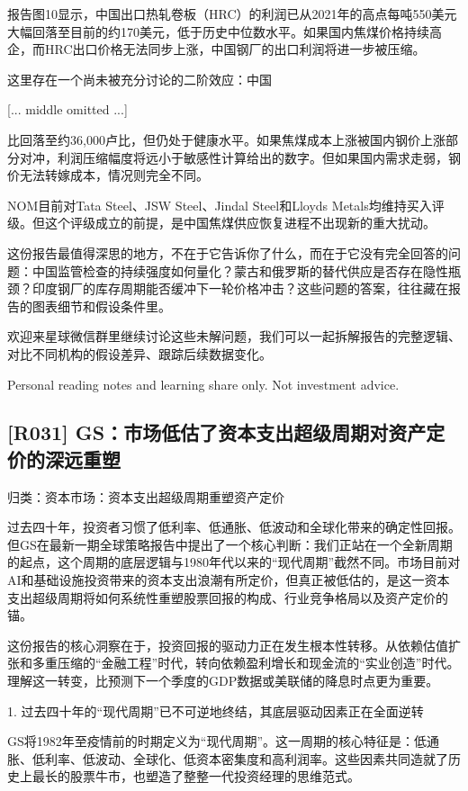 \documentclass[11pt]{ctexart}
\begin{document}
报告图10显示，中国出口热轧卷板（HRC）的利润已从2021年的高点每吨550美元大幅回落至目前的约170美元，低于历史中位数水平。如果国内焦煤价格持续高企，而HRC出口价格无法同步上涨，中国钢厂的出口利润将进一步被压缩。

这里存在一个尚未被充分讨论的二阶效应：中国

[... middle omitted ...]

比回落至约36,000卢比，但仍处于健康水平。如果焦煤成本上涨被国内钢价上涨部分对冲，利润压缩幅度将远小于敏感性计算给出的数字。但如果国内需求走弱，钢价无法转嫁成本，情况则完全不同。

NOM目前对Tata Steel、JSW Steel、Jindal Steel和Lloyds Metals均维持买入评级。但这个评级成立的前提，是中国焦煤供应恢复进程不出现新的重大扰动。

这份报告最值得深思的地方，不在于它告诉你了什么，而在于它没有完全回答的问题：中国监管检查的持续强度如何量化？蒙古和俄罗斯的替代供应是否存在隐性瓶颈？印度钢厂的库存周期能否缓冲下一轮价格冲击？这些问题的答案，往往藏在报告的图表细节和假设条件里。

欢迎来星球微信群里继续讨论这些未解问题，我们可以一起拆解报告的完整逻辑、对比不同机构的假设差异、跟踪后续数据变化。

Personal reading notes and learning share only. Not investment advice.

\subsection{[R031] GS：市场低估了资本支出超级周期对资产定价的深远重塑}
{\small\color{refgray}归类：资本市场：资本支出超级周期重塑资产定价}

过去四十年，投资者习惯了低利率、低通胀、低波动和全球化带来的确定性回报。但GS在最新一期全球策略报告中提出了一个核心判断：我们正站在一个全新周期的起点，这个周期的底层逻辑与1980年代以来的“现代周期”截然不同。市场目前对AI和基础设施投资带来的资本支出浪潮有所定价，但真正被低估的，是这一资本支出超级周期将如何系统性重塑股票回报的构成、行业竞争格局以及资产定价的锚。

这份报告的核心洞察在于，投资回报的驱动力正在发生根本性转移。从依赖估值扩张和多重压缩的“金融工程”时代，转向依赖盈利增长和现金流的“实业创造”时代。理解这一转变，比预测下一个季度的GDP数据或美联储的降息时点更为重要。

1. 过去四十年的“现代周期”已不可逆地终结，其底层驱动因素正在全面逆转

GS将1982年至疫情前的时期定义为“现代周期”。这一周期的核心特征是：低通胀、低利率、低波动、全球化、低资本密集度和高利润率。这些因素共同造就了历史上最长的股票牛市，也塑造了整整一代投资经理的思维范式。
\end{document}
